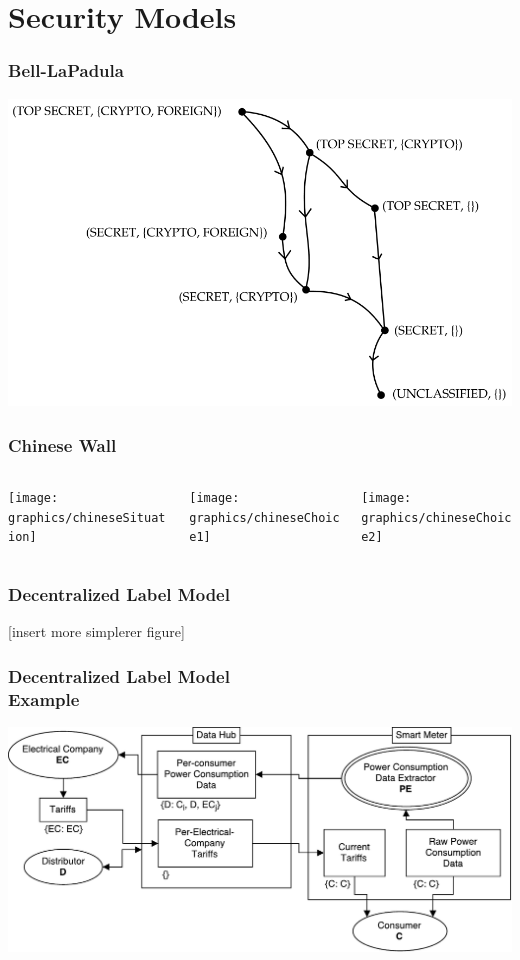 
\section{Security Models}

\begin{frame}
  \frametitle{Bell-LaPadula}
  \centering

  \includegraphics[width=\textwidth]{graphics/blp_lattice}
\end{frame}

\begin{frame}
  \frametitle{Chinese Wall}

  \begin{columns}
    \begin{column}{.33\textwidth}
      \texttt{[image: graphics/chineseSituation]}
    \end{column}
    \begin{column}{.33\textwidth}
      \texttt{[image: graphics/chineseChoice1]}
    \end{column}
    \begin{column}{.33\textwidth}
      \texttt{[image: graphics/chineseChoice2]}
    \end{column}
  \end{columns}
\end{frame}

\begin{frame}
  \frametitle{Decentralized Label Model}

  [insert more simplerer figure]
\end{frame}

\begin{frame}
  \frametitle{Decentralized Label Model \\
    Example}
  \centering

  \includegraphics[width=\textwidth]{graphics/dlm_sm_example}
\end{frame}
